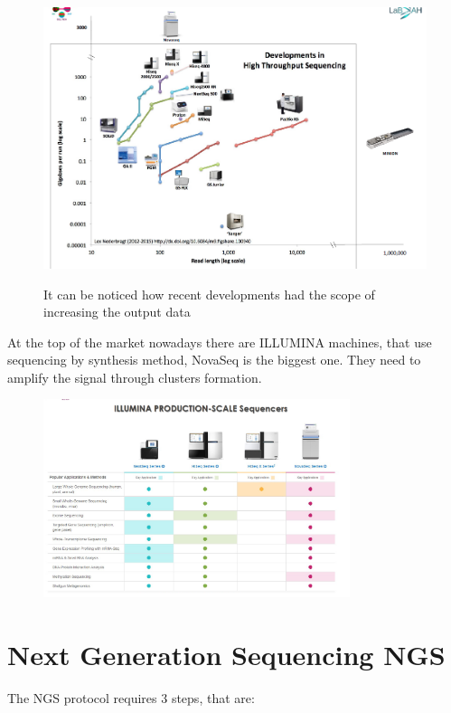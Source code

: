 \begin{figure}[H]
\caption{It can be noticed how recent developments had the scope of increasing the output data}
\centering
\includegraphics[width=1\textwidth]{sequencingMachines}
\label{}
\end{figure}

At the top of the market nowadays there are ILLUMINA machines, that use sequencing by synthesis method, NovaSeq is the biggest one. They need to amplify the signal through clusters formation. 

\begin{figure}[H]
\caption{}
\centering
\includegraphics[width=0.8\textwidth]{sequencingMachinesIllumina}
\label{}
\end{figure}

\section{Next Generation Sequencing NGS}

The NGS protocol requires $3$ steps, that are: 


